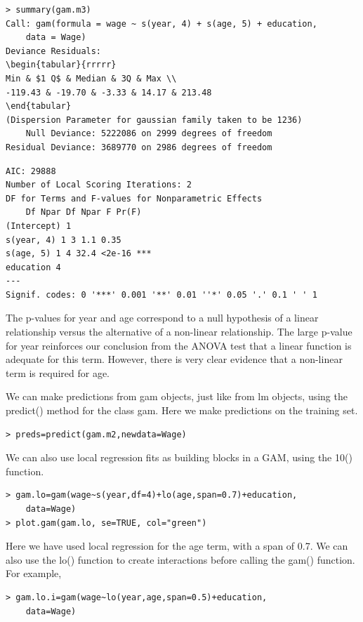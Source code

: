 \documentclass[10pt]{article}
\begin{document}
\begin{verbatim}
> summary(gam.m3)
Call: gam(formula = wage ~ s(year, 4) + s(age, 5) + education,
    data = Wage)
Deviance Residuals:
\begin{tabular}{rrrrr} 
Min & $1 Q$ & Median & 3Q & Max \\
-119.43 & -19.70 & -3.33 & 14.17 & 213.48
\end{tabular}
(Dispersion Parameter for gaussian family taken to be 1236)
    Null Deviance: 5222086 on 2999 degrees of freedom
Residual Deviance: 3689770 on 2986 degrees of freedom
\end{verbatim}

\begin{verbatim}
AIC: 29888
Number of Local Scoring Iterations: 2
DF for Terms and F-values for Nonparametric Effects
    Df Npar Df Npar F Pr(F)
(Intercept) 1
s(year, 4) 1 3 1.1 0.35
s(age, 5) 1 4 32.4 <2e-16 ***
education 4
---
Signif. codes: 0 '***' 0.001 '**' 0.01 ''*' 0.05 '.' 0.1 ' ' 1
\end{verbatim}

The p-values for year and age correspond to a null hypothesis of a linear relationship versus the alternative of a non-linear relationship. The large p-value for year reinforces our conclusion from the ANOVA test that a linear function is adequate for this term. However, there is very clear evidence that a non-linear term is required for age.

We can make predictions from gam objects, just like from lm objects, using the predict() method for the class gam. Here we make predictions on the training set.

\begin{verbatim}
> preds=predict(gam.m2,newdata=Wage)
\end{verbatim}

We can also use local regression fits as building blocks in a GAM, using the 10() function.

\begin{verbatim}
> gam.lo=gam(wage~s(year,df=4)+lo(age,span=0.7)+education,
    data=Wage)
> plot.gam(gam.lo, se=TRUE, col="green")
\end{verbatim}

Here we have used local regression for the age term, with a span of 0.7. We can also use the lo() function to create interactions before calling the gam() function. For example,

\begin{verbatim}
> gam.lo.i=gam(wage~lo(year,age,span=0.5)+education,
    data=Wage)
\end{verbatim}
\end{document}
